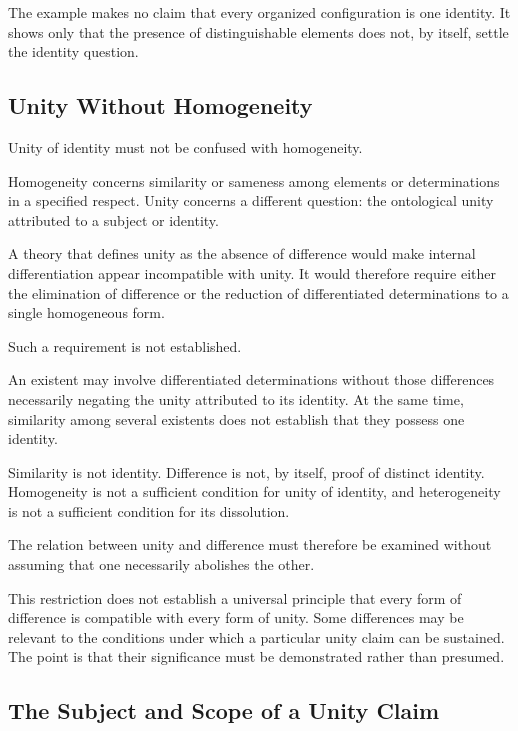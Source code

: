 

The example makes no claim that every organized
configuration is one identity. It shows only
that the presence of distinguishable elements
does not, by itself, settle the identity question.

\subsection{Unity Without Homogeneity}

Unity of identity must not be confused with
homogeneity.

Homogeneity concerns similarity or sameness
among elements or determinations in a specified
respect. Unity concerns a different question:
the ontological unity attributed to a subject
or identity.

A theory that defines unity as the absence of
difference would make internal differentiation
appear incompatible with unity. It would therefore
require either the elimination of difference
or the reduction of differentiated determinations
to a single homogeneous form.

Such a requirement is not established.

An existent may involve differentiated determinations
without those differences necessarily negating
the unity attributed to its identity. At the same
time, similarity among several existents does
not establish that they possess one identity.

Similarity is not identity. Difference is not,
by itself, proof of distinct identity. Homogeneity
is not a sufficient condition for unity of identity,
and heterogeneity is not a sufficient condition
for its dissolution.

The relation between unity and difference must
therefore be examined without assuming that
one necessarily abolishes the other.

This restriction does not establish a universal
principle that every form of difference is
compatible with every form of unity. Some differences
may be relevant to the conditions under which
a particular unity claim can be sustained.
The point is that their significance must be
demonstrated rather than presumed.

\subsection{The Subject and Scope of a Unity Claim}

